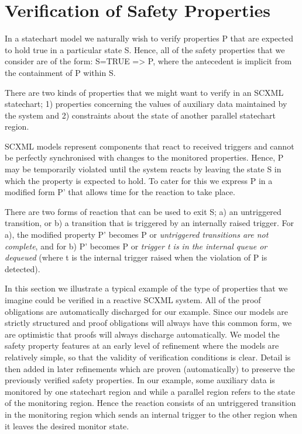 

\section{Verification of Safety Properties}

In a statechart model we naturally wish to verify properties P that are expected to hold true in a particular state S.
Hence, all of the safety properties that we consider are of the form: S=TRUE => P, where the antecedent is implicit from the containment of P within S.

There are two kinds of properties that we might want to verify in an SCXML statechart;
1) properties concerning the values of auxiliary data maintained by the system and 2) constraints about the state of another parallel statechart region.

SCXML models represent components that react to received triggers and cannot be perfectly synchronised with changes to the monitored properties. 
Hence, P may be temporarily violated until the system reacts by leaving the state S in which the property is expected to hold.
To cater for this we express P in a modified form P' that allows time for the reaction to take place.

There are two forms of reaction that can be used to exit S; a) an untriggered transition, or b) a transition that is triggered by an internally raised trigger.
For a), the modified property P' becomes P or \emph{untriggered transitions are not complete}, and for b) P' becomes P or \emph{trigger t is in the internal queue or dequeued} (where t is the internal trigger raised when the violation of P is detected).


In this section we illustrate a typical example of the type of properties that we imagine could be verified in a reactive SCXML system.
All of the proof obligations are automatically discharged for our example.
Since our models are strictly structured and proof obligations will always have this common form, we are optimistic that proofs will always discharge automatically.
We model the safety property features at an early level of refinement where the models are relatively simple, so that the validity of verification conditions is clear. 
Detail is then added in later refinements which are proven (automatically) to preserve the previously verified safety properties.
In our example, some auxiliary data is monitored by one statechart region and while a parallel region refers to the state of the monitoring region. 
Hence the reaction consists of an untriggered transition in the monitoring region which sends an internal trigger to the other region when it leaves the desired monitor state.

